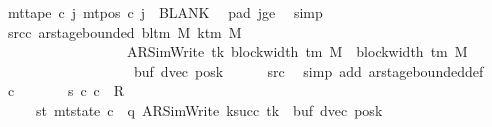 \begin{isabellebody}
\ {\isachardoublequoteopen}mt{\isacharunderscore}{\kern0pt}tape\ c{}\ j\ {\isacharparenleft}{\kern0pt}mt{\isacharunderscore}{\kern0pt}pos\ c{}\ j{\isacharparenright}{\kern0pt}\ {\isacharequal}{\kern0pt}\ BLANK{}{\isachardoublequoteclose}\ \isamarkupfalse%
\ pad{}\ jge\ \isamarkupfalse%
\ simp\isanewline
\ \ \isamarkupfalse%
\isanewline
\ \ \isamarkupfalse%
\ src{\isacharunderscore}{\kern0pt}c{}{\isacharcolon}{\kern0pt}\ {\isachardoublequoteopen}ar{\isacharunderscore}{\kern0pt}stage{\isacharunderscore}{\kern0pt}bounded\ {\isacharparenleft}{\kern0pt}bl{\isacharunderscore}{\kern0pt}tm\ M{\isacharparenright}{\kern0pt}\ {\isacharparenleft}{\kern0pt}k{\isacharunderscore}{\kern0pt}tm\ M{\isacharparenright}{\kern0pt}\isanewline
\ \ \ \ \ \ \ \ \ \ \ \ \ \ \ \ \ \ {\isacharparenleft}{\kern0pt}AR{\isacharunderscore}{\kern0pt}SimWrite{\isacharcomma}{\kern0pt}\ tk{\isacharcomma}{\kern0pt}\ block{\isacharunderscore}{\kern0pt}width\ {\isacharparenleft}{\kern0pt}{\isasymGamma}{\isacharunderscore}{\kern0pt}tm\ M{\isacharparenright}{\kern0pt}\ {\isacharplus}{\kern0pt}\ {\isacharparenleft}{\kern0pt}block{\isacharunderscore}{\kern0pt}width\ {\isacharparenleft}{\kern0pt}{\isasymGamma}{\isacharunderscore}{\kern0pt}tm\ M{\isacharparenright}{\kern0pt}\ {\isacharminus}{\kern0pt}\ {}{\isacharparenright}{\kern0pt}{\isacharcomma}{\kern0pt}\isanewline
\ \ \ \ \ \ \ \ \ \ \ \ \ \ \ \ \ \ \ buf{\isacharcomma}{\kern0pt}\ dvec{\isacharcomma}{\kern0pt}\ posk{\isacharparenright}{\kern0pt}{\isachardoublequoteclose}\isanewline
\ \ \ \ \isamarkupfalse%
\ src{}\ \isamarkupfalse%
\ {\isacharparenleft}{\kern0pt}simp\ add{\isacharcolon}{\kern0pt}\ ar{\isacharunderscore}{\kern0pt}stage{\isacharunderscore}{\kern0pt}bounded{\isacharunderscore}{\kern0pt}def{\isacharparenright}{\kern0pt}\isanewline
\ \ \isamarkupfalse%
\ c{}\ \isanewline
\ \ \ \ \ \ s{}{\isacharcolon}{\kern0pt}\ {\isachardoublequoteopen}{\isacharparenleft}{\kern0pt}c{}{\isacharcomma}{\kern0pt}\ c{}{\isacharparenright}{\kern0pt}\ {\isasymin}\ {\isacharquery}{\kern0pt}R{\isachardoublequoteclose}\isanewline
\ \ \ \ \ st{}{\isacharcolon}{\kern0pt}\ {\isachardoublequoteopen}mt{\isacharunderscore}{\kern0pt}state\ c{}\ {\isacharequal}{\kern0pt}\ {\isacharparenleft}{\kern0pt}q{\isacharcomma}{\kern0pt}\ AR{\isacharunderscore}{\kern0pt}SimWrite{\isacharcomma}{\kern0pt}\ k{\isacharunderscore}{\kern0pt}succ\ tk{\isacharcomma}{\kern0pt}\ {}{\isacharcomma}{\kern0pt}\ buf{\isacharcomma}{\kern0pt}\ dvec{\isacharcomma}{\kern0pt}\ posk{\isacharparenright}{\kern0pt}{\isachardoublequoteclose}\isanewline

\end{isabellebody}
